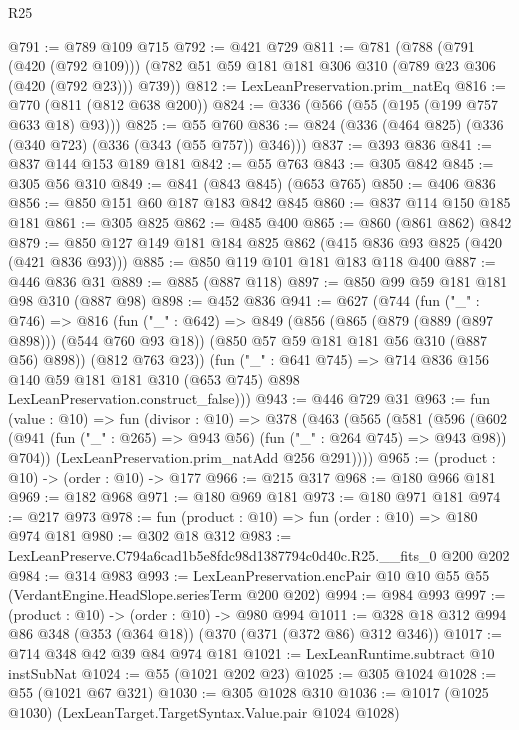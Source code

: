 \begin{lexlean}{R25}
\begin{coremodule}
@791 := @789 @109 @715
@792 := @421 @729
@811 := @781
    (@788
      (@791 (@420 (@792 @109)))
      (@782 @51 @59 @181 @181 @306 @310 (@789 @23 @306 (@420 (@792 @23))) @739))
@812 := LexLeanPreservation.prim_natEq
@816 := @770 (@811 (@812 @638 @200))
@824 := @336 (@566 (@55 (@195 (@199 @757 @633 @18) @93)))
@825 := @55 @760
@836 := @824 (@336 (@464 @825) (@336 (@340 @723) (@336 (@343 (@55 @757)) @346)))
@837 := @393 @836
@841 := @837 @144 @153 @189 @181
@842 := @55 @763
@843 := @305 @842
@845 := @305 @56 @310
@849 := @841 (@843 @845) (@653 @765)
@850 := @406 @836
@856 := @850 @151 @60 @187 @183 @842 @845
@860 := @837 @114 @150 @185 @181
@861 := @305 @825
@862 := @485 @400
@865 := @860 (@861 @862) @842
@879 := @850 @127 @149 @181 @184 @825 @862 (@415 @836 @93 @825 (@420 (@421 @836 @93)))
@885 := @850 @119 @101 @181 @183 @118 @400
@887 := @446 @836 @31
@889 := @885 (@887 @118)
@897 := @850 @99 @59 @181 @181 @98 @310 (@887 @98)
@898 := @452 @836
@941 := @627
    (@744
      (fun ("_" : @746) =>
      @816
        (fun ("_" : @642) =>
        @849
          (@856
            (@865 (@879 (@889 (@897 @898))) (@544 @760 @93 @18))
            (@850 @57 @59 @181 @181 @56 @310 (@887 @56) @898))
          (@812 @763 @23))
        (fun ("_" : @641 @745) =>
        @714
          @836
          @156
          @140
          @59
          @181
          @181
          @310
          (@653 @745)
          @898
          LexLeanPreservation.construct_false)))
@943 := @446 @729 @31
@963 := fun (value : @10) =>
  fun (divisor : @10) =>
  @378
    (@463
      (@565
        (@581
          (@596
            (@602 (@941 (fun ("_" : @265) => @943 @56) (fun ("_" : @264 @745) => @943 @98)) @704))
          (LexLeanPreservation.prim_natAdd @256 @291))))
@965 := (product : @10) -> (order : @10) -> @177
@966 := @215 @317
@968 := @180 @966 @181
@969 := @182 @968
@971 := @180 @969 @181
@973 := @180 @971 @181
@974 := @217 @973
@978 := fun (product : @10) => fun (order : @10) => @180 @974 @181
@980 := @302 @18 @312
@983 := LexLeanPreserve.C794a6cad1b5e8fdc98d1387794c0d40c.R25.__fits_0 @200 @202
@984 := @314 @983
@993 := LexLeanPreservation.encPair @10 @10 @55 @55 (VerdantEngine.HeadSlope.seriesTerm @200 @202)
@994 := @984 @993
@997 := (product : @10) -> (order : @10) -> @980 @994
@1011 := @328 @18 @312 @994 @86 @348 (@353 (@364 @18)) (@370 (@371 (@372 @86) @312 @346))
@1017 := @714 @348 @42 @39 @84 @974 @181
@1021 := LexLeanRuntime.subtract @10 instSubNat
@1024 := @55 (@1021 @202 @23)
@1025 := @305 @1024
@1028 := @55 (@1021 @67 @321)
@1030 := @305 @1028 @310
@1036 := @1017 (@1025 @1030) (LexLeanTarget.TargetSyntax.Value.pair @1024 @1028)

\end{coremodule}
\end{lexlean}
